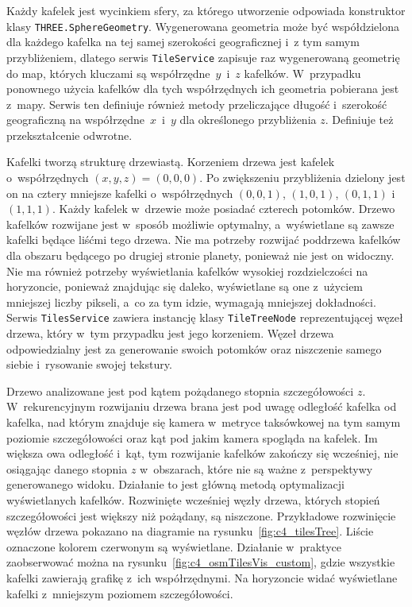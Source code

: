 Każdy kafelek jest wycinkiem sfery, za którego utworzenie odpowiada konstruktor klasy \texttt{THREE.SphereGeometry}. Wygenerowana geometria może być współdzielona dla każdego kafelka na tej samej szerokości geograficznej i~z tym samym przybliżeniem, dlatego serwis \texttt{TileService} zapisuje raz wygenerowaną geometrię do map, których kluczami są współrzędne~$y$~i~$z$ kafelków. W~przypadku ponownego użycia kafelków dla tych współrzędnych ich geometria pobierana jest z~mapy. Serwis ten definiuje również metody przeliczające długość i~szerokość geograficzną na współrzędne~$x$~i~$y$ dla określonego przybliżenia $z$. Definiuje też przekształcenie odwrotne.

Kafelki tworzą strukturę drzewiastą. Korzeniem drzewa jest kafelek o~współrzędnych $(x, y, z) = (0,0,0)$. Po zwiększeniu przybliżenia dzielony jest on na cztery mniejsze kafelki o~współrzędnych $(0,0,1)$, $(1,0,1)$, $(0,1,1)$ i~$(1,1,1)$. Każdy kafelek w~drzewie może posiadać czterech potomków. Drzewo kafelków rozwijane jest w~sposób możliwie optymalny, a~wyświetlane są zawsze kafelki będące liśćmi tego drzewa. Nie ma potrzeby rozwijać poddrzewa kafelków dla obszaru będącego po drugiej stronie planety, ponieważ nie jest on widoczny. Nie ma również potrzeby wyświetlania kafelków wysokiej rozdzielczości na horyzoncie, ponieważ znajdując się daleko, wyświetlane są one z~użyciem mniejszej liczby pikseli, a~co za tym idzie, wymagają mniejszej dokładności. Serwis \texttt{TilesService} zawiera instancję klasy \texttt{TileTreeNode} reprezentującej węzeł drzewa, który w~tym przypadku jest jego korzeniem. Węzeł drzewa odpowiedzialny jest za generowanie swoich potomków oraz niszczenie samego siebie i~rysowanie swojej tekstury.

Drzewo analizowane jest pod kątem pożądanego stopnia szczegółowości $z$. W~rekurencyjnym rozwijaniu drzewa brana jest pod uwagę odległość kafelka od kafelka, nad którym znajduje się kamera w~metryce taksówkowej na tym samym poziomie szczegółowości oraz kąt pod jakim kamera spogląda na kafelek. Im większa owa odległość i~kąt, tym rozwijanie kafelków zakończy się wcześniej, nie osiągając danego stopnia $z$ w~obszarach, które nie są ważne z~perspektywy generowanego widoku. Działanie to jest główną metodą optymalizacji wyświetlanych kafelków. Rozwinięte wcześniej węzły drzewa, których stopień szczegółowości jest większy niż pożądany, są niszczone. Przykładowe rozwinięcie węzłów drzewa pokazano na diagramie na rysunku~\ref{fig:c4_tilesTree}. Liście oznaczone kolorem czerwonym są wyświetlane. Działanie w~praktyce zaobserwować można na rysunku~\ref{fig:c4_osmTilesVis_custom}, gdzie wszystkie kafelki zawierają grafikę z~ich współrzędnymi. Na horyzoncie widać wyświetlane kafelki z~mniejszym poziomem szczegółowości. 

